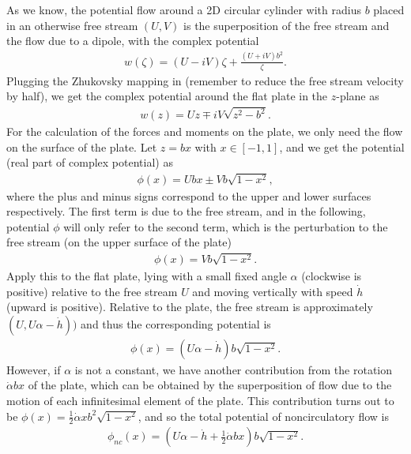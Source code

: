 As we know, the potential flow around a 2D circular cylinder with radius $b$ placed in an otherwise free stream $(U,V)$ is the superposition of the free stream and the flow due to a dipole, with the complex potential
\begin{align}
w(\zeta) = (U-iV)\zeta+\frac{(U+iV)b^2}{\zeta}.
\end{align} 
Plugging the Zhukovsky mapping in (remember to reduce the free stream velocity by half), we get the complex potential around the flat plate in the $z$-plane as
\begin{align}
w(z) = Uz \mp iV\sqrt{z^2-b^2}.
\end{align} 
For the calculation of the forces and moments on the plate, we only need the flow on the surface of the plate.
Let $z = bx$ with $x \in [-1, 1]$, and we get the potential (real part of complex potential) as
\begin{align}
\phi(x) = Ubx \pm Vb\sqrt{1-x^2},
\end{align} 
where the plus and minus signs correspond to the upper and lower surfaces respectively. 
The first term is due to the free stream, and in the following, potential $\phi$ will only refer to the second term, which is the perturbation to the free stream (on the upper surface of the plate)
\begin{align}
\phi(x) = Vb\sqrt{1-x^2}.
\end{align} 
Apply this to the flat plate, lying with a small fixed angle $\alpha$ (clockwise is positive) relative to the free stream $U$ and moving vertically with speed $\dot{h}$ (upward is positive).
Relative to the plate, the free stream is approximately $(U, U \alpha - \dot{h}))$ and thus the corresponding potential is
\begin{align}
\phi(x) = (U \alpha - \dot{h}) b \sqrt{1-x^2}.
\end{align} 
However, if $\alpha$ is not a constant, we have another contribution from the rotation $\dot{\alpha}bx$ of the plate, which can be obtained by the superposition of flow due to the motion of each infinitesimal element of the plate.
This contribution turns out to be $\phi(x) = \frac{1}{2}\dot{\alpha}xb^2\sqrt{1-x^2}$, and so the total potential of noncirculatory flow is
\begin{align}
\phi_{nc}(x) = (U\alpha - \dot{h} + \frac{1}{2}\dot{\alpha}bx) b\sqrt{1-x^2}.
\end{align} 

